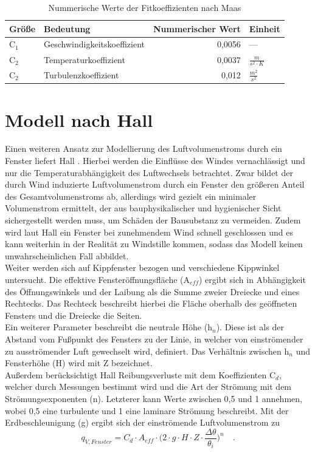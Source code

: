 \begin{table}[H] \centering
\begin{tabular}{|l|l|r|l|}
\hline
\rowcolor[HTML]{C0C0C0} 
Größe & Bedeutung & \multicolumn{1}{l|}{\cellcolor[HTML]{C0C0C0}Nummerischer Wert} & Einheit \\ \hline
C\(_1\) & Geschwindigkeitskoeffizient & 0,0056 & --- \\ \hline
\rowcolor[HTML]{EFEFEF} 
C\(_2\) & Temperaturkoeffizient & 0,0037 & \(\frac{m}{s^2 \cdot K}\) \\ \hline
C\(_2\) & Turbulenzkoeffizient & 0,012 & \(\frac{m^2}{s^2}\) \\ \hline
\end{tabular}
\caption{Nummerische Werte der Fitkoeffizienten nach Maas \cite{Maas.1995}}
\label{tab: Tabelle3312}
\end{table}

\section*{Modell nach Hall}
Einen weiteren Ansatz zur Modellierung des Luftvolumenstroms durch ein Fenster liefert Hall \cite{Hall.2004}.
Hierbei werden die Einflüsse des Windes vernachlässigt und nur die Temperaturabhängigkeit des Luftwechsels betrachtet.
Zwar bildet der durch Wind induzierte Luftvolumenstrom durch ein Fenster den größeren Anteil des Gesamtvolumenstroms ab, allerdings wird gezielt ein minimaler Volumenstrom ermittelt, der aus bauphysikalischer und hygienischer Sicht sichergestellt werden muss, um Schäden der Bausubstanz zu vermeiden.
Zudem wird laut Hall ein Fenster bei zunehmendem Wind schnell geschlossen und es kann weiterhin in der Realität zu Windstille kommen, sodass das Modell keinen unwahrscheinlichen Fall abbildet.\\
Weiter werden sich auf Kippfenster bezogen und verschiedene Kippwinkel untersucht.
Die effektive Fensteröffnungsfläche (A\(_{eff}\)) ergibt sich in Abhängigkeit des Öffnungswinkels und der Laibung als die Summe zweier Dreiecke und eines Rechtecks.
Das Rechteck beschreibt hierbei die Fläche oberhalb des geöffneten Fensters und die Dreiecke die Seiten.\\
Ein weiterer Parameter beschreibt die neutrale Höhe (h\(_n\)). 
Diese ist als der Abstand vom Fußpunkt des Fensters zu der Linie, in welcher von einströmender zu ausströmender Luft gewechselt wird, definiert.
Das Verhältnis zwischen h\(_n\) und Fensterhöhe (H) wird mit Z bezeichnet.\\
Außerdem berücksichtigt Hall Reibungsverluste mit dem Koeffizienten C\(_d\), welcher durch Messungen bestimmt wird und die Art der Strömung mit dem Strömungsexponenten (n). 
Letzterer kann Werte zwischen 0,5 und 1 annehmen, wobei 0,5 eine turbulente und 1 eine laminare Strömung beschreibt.
Mit der Erdbeschleunigung (g) ergibt sich der einströmende Luftvolumenstrom zu
\begin{equation}
\label{eq:Gleichung3312}
q_{V, Fenster} = C_d \cdot A_{eff} \cdot \Biggl( 2 \cdot g \cdot H \cdot Z \cdot \frac{\Delta\theta}{\theta_i}\Biggr)^n \quad \text{.}
\end{equation}

